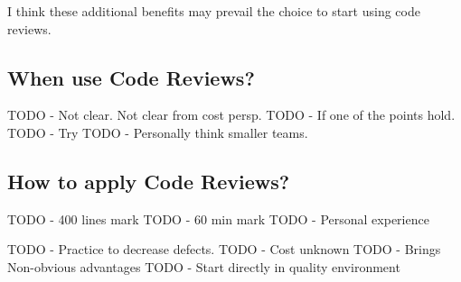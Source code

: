 I think these additional benefits may prevail the choice to start using code reviews.

\subsection*{When use Code Reviews?}

TODO - Not clear. Not clear from cost persp.
TODO - If one of the points hold.
TODO - Try
TODO - Personally think smaller teams.

\subsection*{How to apply Code Reviews?}

TODO - 400 lines mark
TODO - 60 min mark
TODO - Personal experience


TODO - Practice to decrease defects.
TODO - Cost unknown
TODO - Brings Non-obvious advantages
TODO - Start directly in quality environment